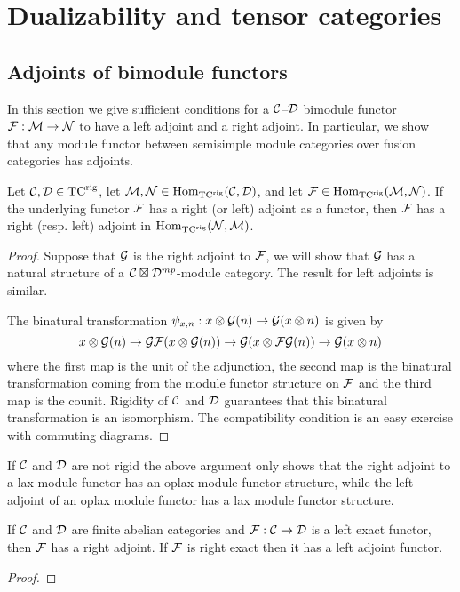 \documentclass{amsart}
\begin{document}
\section{Dualizability and tensor categories} \label{sec-dualfusion}


\subsection{Adjoints of bimodule functors} \label{sec-df-functors}

In this section we give sufficient conditions for a $\mathcal C$--$\mathcal D$ bimodule functor $\mathcal F: \mathcal M \rightarrow \mathcal N$ to have a left adjoint and a right adjoint.  In particular, we show that any module functor between semisimple module categories over fusion categories has adjoints.

\begin{lemma} \label{module-adjoint}
Let $\mathcal C, \mathcal D \in {\mathrm{TC}^{\text{rig}}}$, let $\mathcal M, \mathcal N \in \operatorname{Hom}_{\mathrm{TC}^{\text{rig}}}(\mathcal C,\mathcal D)$, and let $\mathcal F \in \operatorname{Hom}_{{\mathrm{TC}^{\text{rig}}}}(\mathcal M,\mathcal N)$.  If the underlying functor $\mathcal F$ has a right (or left) adjoint as a functor, then $\mathcal F$ has a right (resp. left) adjoint in $\operatorname{Hom}_{{\mathrm{TC}^{\text{rig}}}}(\mathcal N,\mathcal M)$.
\end{lemma}
\begin{proof}
Suppose that $\mathcal G$ is the right adjoint to $\mathcal F$, we will show that $\mathcal G$ has a natural structure of a $\mathcal C\boxtimes \mathcal D^{mp}$-module category.  The result for left adjoints is similar.

The binatural transformation $\psi_{x,n}: x \otimes \mathcal G(n) \rightarrow \mathcal G(x \otimes n)$ is given by
$$x \otimes \mathcal G(n) \rightarrow \mathcal G \mathcal F(x \otimes \mathcal G(n)) \rightarrow \mathcal G(x \otimes \mathcal F\mathcal G(n)) \rightarrow \mathcal G(x \otimes n)$$
where the first map is the unit of the adjunction, the second map is the binatural transformation coming from the module functor structure on $\mathcal F$ and the third map is the counit.  Rigidity of $\mathcal C$ and $\mathcal D$ guarantees that this binatural transformation is an isomorphism.  The compatibility condition is an easy exercise with commuting diagrams.
\end{proof}

\begin{remark}
If $\mathcal C$ and $\mathcal D$ are not rigid the above argument only shows that the right adjoint to a lax module functor has an oplax module functor structure, while the left adjoint of an oplax module functor has a lax module functor structure.  
\end{remark}

\begin{proposition}
If $\mathcal C$ and $\mathcal D$ are finite abelian categories and $\mathcal F: \mathcal C \rightarrow \mathcal D$ is a left exact functor, then $\mathcal F$ has a right adjoint.  If $\mathcal F$ is right exact then it has a left adjoint functor.
\end{proposition}
\begin{proof}

\end{proof}
\end{document}
